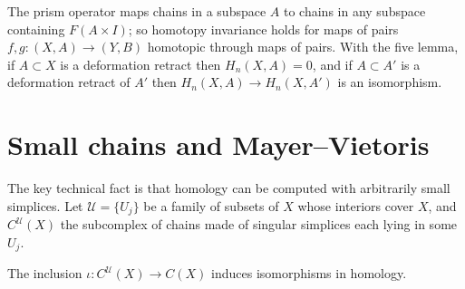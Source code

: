 The prism operator maps chains in a subspace $A$ to chains in any subspace containing $F(A\times I)$; so homotopy invariance holds for maps of pairs $f,g\colon(X,A)\to(Y,B)$ homotopic through maps of
pairs. With the five lemma, if $A\subset X$ is a deformation retract then $H_n(X,A)=0$, and if $A\subset A'$ is a deformation retract of $A'$ then $H_n(X,A)\to H_n(X,A')$ is an isomorphism.

\section{Small chains and Mayer--Vietoris}

The key technical fact is that homology can be computed with arbitrarily small simplices. Let $\mathcal U=\{U_j\}$ be a family of subsets of $X$ whose interiors cover $X$, and $C^{\mathcal U}(X)$ the
subcomplex of chains made of singular simplices each lying in some $U_j$.

\begin{theorem}\label{thm:smallchains}
The inclusion $\iota\colon C^{\mathcal U}(X)\to C(X)$ induces isomorphisms in homology.
\end{theorem}

